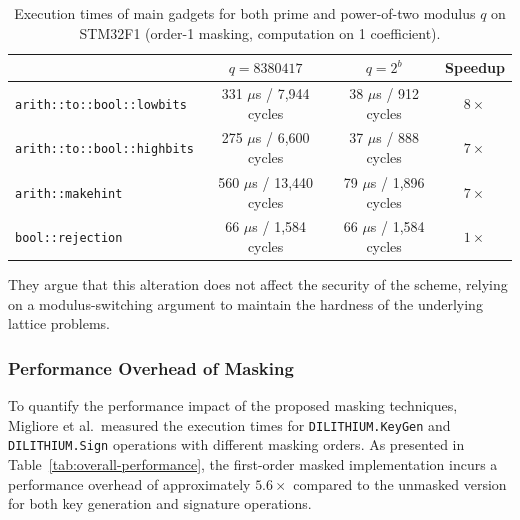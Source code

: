 \begin{table}[h]
    \centering
    \caption{Execution times of main gadgets for both prime and power-of-two modulus $q$ on STM32F1 (order-1 masking, computation on 1 coefficient).}
    \label{tab:performance-masking}
    \begin{tabular}{|l|c|c|c|}
        \hline
                                           & $q = 8380417$              & $q = 2^b$                & Speedup   \\
        \hline
        \texttt{arith::to::bool::lowbits}  & 331 $\mu$s / 7,944 cycles  & 38 $\mu$s / 912 cycles   & $8\times$ \\
        \texttt{arith::to::bool::highbits} & 275 $\mu$s / 6,600 cycles  & 37 $\mu$s / 888 cycles   & $7\times$ \\
        \texttt{arith::makehint}           & 560 $\mu$s / 13,440 cycles & 79 $\mu$s / 1,896 cycles & $7\times$ \\
        \texttt{bool::rejection}           & 66 $\mu$s / 1,584 cycles   & 66 $\mu$s / 1,584 cycles & $1\times$ \\
        \hline
    \end{tabular}
\end{table}

They argue that this alteration does not affect the security of the scheme, relying on a modulus-switching argument to maintain the hardness of the underlying lattice problems.

\subsubsection{Performance Overhead of Masking}

To quantify the performance impact of the proposed masking techniques, Migliore et al.\ measured the execution times for \texttt{DILITHIUM.KeyGen} and \texttt{DILITHIUM.Sign} operations with different masking orders. As presented in Table~\ref{tab:overall-performance}, the first-order masked implementation incurs a performance overhead of approximately $5.6\times$ compared to the unmasked version for both key generation and signature operations.

